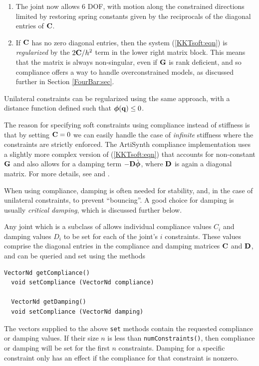 \begin{enumerate}

\item The joint now allows 6 DOF, with motion along the constrained directions
limited by restoring spring constants given by the reciprocals of the
diagonal entries of ${\bf C}$.

\item If ${\bf C}$ has no zero diagonal entries, then the system
(\ref{KKTsoft:eqn}) is {\it regularized} by the $2 {\bf C}/h^2$ term in the
lower right matrix block. This means that the matrix is always
non-singular, even if ${\bf G}$ is rank deficient, and so compliance offers
a way to handle overconstrained models, as discussed further in
Section \ref{FourBar:sec}.

\end{enumerate}

Unilateral constraints can be regularized using the same approach,
with a distance function defined such that $\boldsymbol\phi({\bf q}) \le 0$.  

The reason for specifying soft constraints using compliance instead of
stiffness is that by setting ${\bf C} = 0$ we can easily handle the case of
{\it infinite} stiffness where the constraints are strictly enforced.
The ArtiSynth compliance implementation uses a slightly more complex
version of (\ref{KKTsoft:eqn}) that accounts for non-constant ${\bf G}$ and
also allows for a damping term $-{\bf D} \dot{\boldsymbol\phi}$, where ${\bf D}$ is again a
diagonal matrix.  For more details, see \cite{lacoursiere2007ghosts}
and \cite{servin2006interactive}.

When using compliance, damping is often needed for stability, and, in
the case of unilateral constraints, to prevent ``bouncing''.  A good
choice for damping is usually {\it critical damping}, which is
discussed further below.

Any joint which is a subclass of
 allows
individual compliance values $C_i$ and damping values $D_i$ to be set
for each of the joint's $i$ constraints. These values comprise the
diagonal entries in the compliance and damping matrices ${\bf C}$ and ${\bf D}$,
and can be queried and set using the methods
\begin{lstlisting}[]
  VectorNd getCompliance()
  void setCompliance (VectorNd compliance)

  VectorNd getDamping()
  void setCompliance (VectorNd damping)
\end{lstlisting}
%
The vectors supplied to the above {\tt set} methods contain the
requested compliance or damping values. If their size $n$ is less than
{\tt numConstraints()}, then compliance or damping will be set for the
first $n$ constraints.  Damping for a specific constraint only has an
effect if the compliance for that constraint is nonzero.

